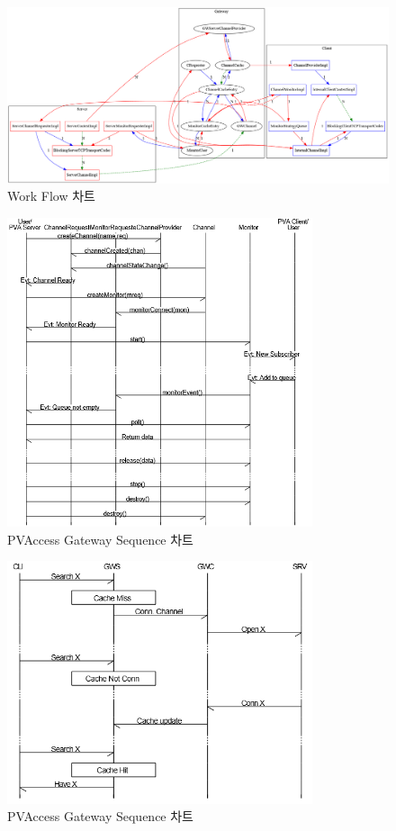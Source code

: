 \documentclass[11pt
  , a4paper
  , article
  , oneside
]{memoir}
\begin{document}
\begin{figure}[!htb]
	\centering
	\includegraphics[width=1\textwidth, height=0.7\textheight]{./images/work_flow.png}
	\caption{
		Work Flow 차트
	}		
	\label{fig:workflow}   
\end{figure}


\begin{figure}[!htb]
	\centering
	\includegraphics[width=0.8\textwidth, height=0.6\textheight]{./images/seqence.png}
	\caption{
		PVAccess Gateway Sequence 차트
	}
	\label{fig:sequence}   
\end{figure}

\begin{figure}[!htb]
	\centering
	\includegraphics[width=0.8\textwidth, height=0.6\textheight]{./images/cached.png}
	\caption{
		PVAccess Gateway Sequence 차트
	}
	\label{fig:cached}   
\end{figure}
\end{document}
